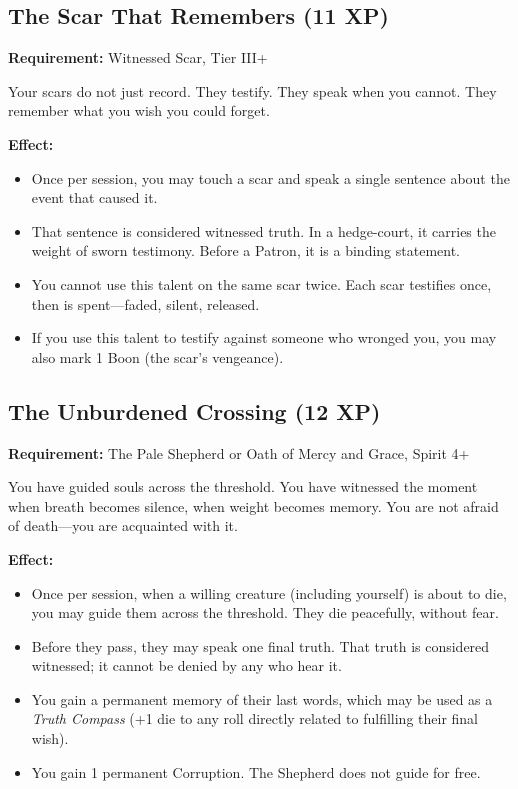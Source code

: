 \subsection{The Scar That Remembers (11 XP)}

\textbf{Requirement:} Witnessed Scar, Tier III+

Your scars do not just record. They testify. They speak when you cannot. They remember what you wish you could forget.

\textbf{Effect:}
\begin{itemize}
\item Once per session, you may touch a scar and speak a single sentence about the event that caused it.
\item That sentence is considered witnessed truth. In a hedge-court, it carries the weight of sworn testimony. Before a Patron, it is a binding statement.
\item You cannot use this talent on the same scar twice. Each scar testifies once, then is spent—faded, silent, released.
\item If you use this talent to testify against someone who wronged you, you may also mark 1 Boon (the scar's vengeance).
\end{itemize}

\subsection{The Unburdened Crossing (12 XP)}

\textbf{Requirement:} The Pale Shepherd or Oath of Mercy and Grace, Spirit 4+

You have guided souls across the threshold. You have witnessed the moment when breath becomes silence, when weight becomes memory. You are not afraid of death—you are acquainted with it.

\textbf{Effect:}
\begin{itemize}
\item Once per session, when a willing creature (including yourself) is about to die, you may guide them across the threshold. They die peacefully, without fear.
\item Before they pass, they may speak one final truth. That truth is considered witnessed; it cannot be denied by any who hear it.
\item You gain a permanent memory of their last words, which may be used as a \textit{Truth Compass} (+1 die to any roll directly related to fulfilling their final wish).
\item You gain 1 permanent Corruption. The Shepherd does not guide for free.
\end{itemize}

